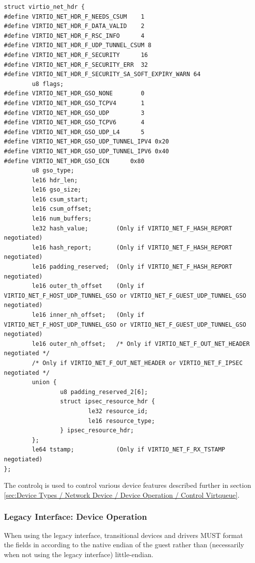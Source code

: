 \begin{lstlisting}
struct virtio_net_hdr {
#define VIRTIO_NET_HDR_F_NEEDS_CSUM    1
#define VIRTIO_NET_HDR_F_DATA_VALID    2
#define VIRTIO_NET_HDR_F_RSC_INFO      4
#define VIRTIO_NET_HDR_F_UDP_TUNNEL_CSUM 8
#define VIRTIO_NET_HDR_F_SECURITY      16
#define VIRTIO_NET_HDR_F_SECURITY_ERR  32
#define VIRTIO_NET_HDR_F_SECURITY_SA_SOFT_EXPIRY_WARN 64
        u8 flags;
#define VIRTIO_NET_HDR_GSO_NONE        0
#define VIRTIO_NET_HDR_GSO_TCPV4       1
#define VIRTIO_NET_HDR_GSO_UDP         3
#define VIRTIO_NET_HDR_GSO_TCPV6       4
#define VIRTIO_NET_HDR_GSO_UDP_L4      5
#define VIRTIO_NET_HDR_GSO_UDP_TUNNEL_IPV4 0x20
#define VIRTIO_NET_HDR_GSO_UDP_TUNNEL_IPV6 0x40
#define VIRTIO_NET_HDR_GSO_ECN      0x80
        u8 gso_type;
        le16 hdr_len;
        le16 gso_size;
        le16 csum_start;
        le16 csum_offset;
        le16 num_buffers;
        le32 hash_value;        (Only if VIRTIO_NET_F_HASH_REPORT negotiated)
        le16 hash_report;       (Only if VIRTIO_NET_F_HASH_REPORT negotiated)
        le16 padding_reserved;  (Only if VIRTIO_NET_F_HASH_REPORT negotiated)
        le16 outer_th_offset    (Only if VIRTIO_NET_F_HOST_UDP_TUNNEL_GSO or VIRTIO_NET_F_GUEST_UDP_TUNNEL_GSO negotiated)
        le16 inner_nh_offset;   (Only if VIRTIO_NET_F_HOST_UDP_TUNNEL_GSO or VIRTIO_NET_F_GUEST_UDP_TUNNEL_GSO negotiated)
        le16 outer_nh_offset;   /* Only if VIRTIO_NET_F_OUT_NET_HEADER negotiated */
        /* Only if VIRTIO_NET_F_OUT_NET_HEADER or VIRTIO_NET_F_IPSEC negotiated */
        union {
                u8 padding_reserved_2[6];
                struct ipsec_resource_hdr {
                        le32 resource_id;
                        le16 resource_type;
                } ipsec_resource_hdr;
        };
        le64 tstamp;            (Only if VIRTIO_NET_F_RX_TSTAMP negotiated)
};
\end{lstlisting}

The controlq is used to control various device features described further in
section \ref{sec:Device Types / Network Device / Device Operation / Control Virtqueue}.

\subsubsection{Legacy Interface: Device Operation}\label{sec:Device Types / Network Device / Device Operation / Legacy Interface: Device Operation}
When using the legacy interface, transitional devices and drivers
MUST format the fields in 
according to the native endian of the guest rather than
(necessarily when not using the legacy interface) little-endian.

